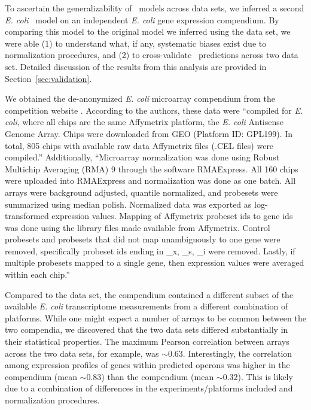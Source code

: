 To ascertain the generalizability of \egrine~models across data sets,
we inferred a second \textit{E. coli} \egrine~model on an
independent \textit{E. coli} gene expression compendium. By comparing
this model to the original model we inferred using
the  data set, we were able (1) to understand what,
if any, systematic biases exist due to normalization procedures, and
(2) to cross-validate \egrine~predictions across two data
set. Detailed discussion of the results from this analysis are
provided in Section~\ref{sec:validation}.

We obtained the de-anonymized {\it E. coli} microarray compendium from
the  competition website \cite{Marbach2012}. According
to the authors, these data were ``compiled for {\it E. coli}, where
all chips are the same Affymetrix platform, the \textit{E. coli}
Antisense Genome Array. Chips were downloaded from GEO (Platform ID:
GPL199). In total, 805 chips with available raw data Affymetrix files
(.CEL files) were compiled.''  Additionally, ``Microarray
normalization was done using Robust Multichip Averaging (RMA) 9
through the software RMAExpress. All 160 chips were uploaded into
RMAExpress and normalization was done as one batch. All arrays were
background adjusted, quantile normalized, and probesets were
summarized using median polish. Normalized data was exported as
log-transformed expression values. Mapping of Affymetrix probeset ids
to gene ids was done using the library files made available from
Affymetrix. Control probesets and probesets that did not map
unambiguously to one gene were removed, specifically probeset ids
ending in \_x, \_s, \_i were removed. Lastly, if multiple probesets
mapped to a single gene, then expression values were averaged within
each chip.''

Compared to the  \cite{Lemmens2009a} data set,
the  \cite{Marbach2012} compendium contained a
different subset of the available \textit{E. coli} transcriptome
measurements from a different combination of platforms. While one
might expect a number of arrays to be common between the two
compendia, we discovered that the two data sets differed substantially
in their statistical properties. The maximum Pearson correlation
between arrays across the two data sets, for example, was $\sim 0.63$.
Interestingly, the correlation among expression profiles of genes
within predicted operons \cite{Price2005a} was higher in the
 compendium (mean $\sim 0.83$) than the  compendium
(mean $\sim 0.32$). This is likely due to a combination of differences
in the experiments/platforms included and normalization procedures.
